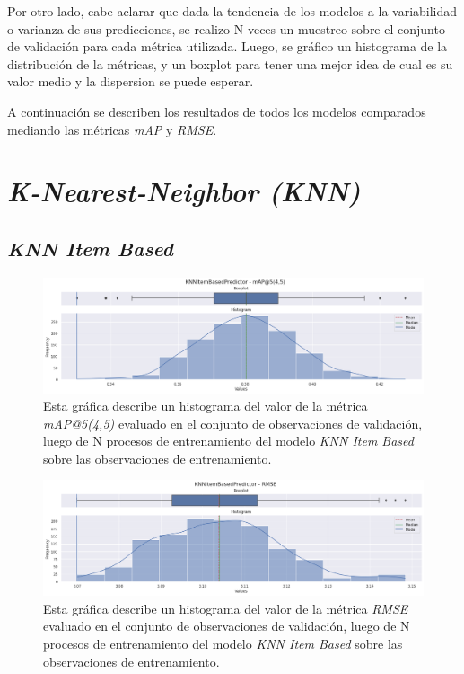 \documentclass[11pt,a4paper,twoside]{thesis}
\begin{document}
Por otro lado, cabe aclarar que dada la tendencia de los modelos a la
variabilidad o varianza de sus predicciones, se realizo N veces un muestreo
sobre el conjunto de validación para cada métrica utilizada. Luego, se gráfico
un histograma de la distribución de la métricas, y un boxplot para tener una
mejor idea de cual es su valor medio y la dispersion se puede esperar.

A continuación se describen los resultados de todos los modelos comparados
mediando las métricas \textit{mAP\makeatletter@k} y \textit{RMSE}.

\section{\textit{K-Nearest-Neighbor (KNN)}}

\subsection{\textit{KNN Item Based}}

\begin{figure}[!htb]
	\centering
	\includegraphics[width=15cm]{./images/metrics-knn-item-based-mapk.png}
	\caption{Esta gráfica describe un histograma del valor de la
		métrica \textit{mAP@5(4,5)} evaluado en el conjunto de
		observaciones de validación, luego de N procesos de entrenamiento
		del modelo \textit{KNN Item Based} sobre las observaciones de
		entrenamiento.}
\end{figure}

\clearpage

\begin{figure}[!htb]
	\centering
	\includegraphics[width=15cm]{./images/metrics-knn-item-based-RMSE.png}
	\caption{Esta gráfica describe un histograma del valor de la
		métrica \textit{RMSE} evaluado en el conjunto de observaciones
		de validación, luego de N procesos de entrenamiento del modelo
		\textit{KNN Item Based} sobre las observaciones de entrenamiento.}
\end{figure}
\end{document}
